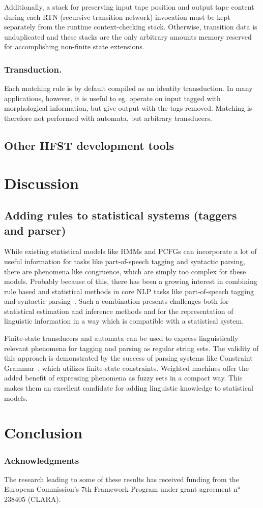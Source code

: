 \documentclass{llncs}
\begin{document}
Additionally, a stack for preserving input tape position
and output tape content during each RTN (recursive transition
network) invocation must be kept separately from the runtime
context-checking stack. Otherwise, transition data is unduplicated
and these stacks are the only arbitrary amounts memory reserved
for accomplishing non-finite state extensions.

\subsubsection{Transduction.}

Each matching rule is by default compiled as an identity transduction.
In many applications, however, it is useful to eg. operate on input
tagged with morphological information, but give output
with the tags removed. Matching is therefore not
performed with automata, but arbitrary transducers.

\subsection{Other HFST development tools}

\section{Discussion}\label{hfst:discussion}

\subsection{Adding rules to statistical systems (taggers and parser)}
While existing statistical models like HMMs and PCFGs can incorporate
a lot of useful information for tasks like part-of-speech tagging and
syntactic parsing, there are phenomena like congruence, which are
simply too complex for these models. Probably because of this, there
has been a growing interest in combining rule based and statistical
methods in core NLP tasks like part-of-speech tagging and syntactic
parsing~\cite{manning/2011}. Such a combination presents challenges
both for statistical estimation and inference methods and for the
representation of linguistic information in a way which is compatible
with a statistical system.

Finite-state transducers and automata can be used to express
linguistically relevant phenomena for tagging and parsing as regular
string sets. The validity of this approach is demonstrated by the
success of parsing systems like Constraint
Grammar~\cite{karlsson/1990}, which utilizes finite-state
constraints. Weighted machines offer the added benefit of expressing
phenomena as fuzzy sets in a compact way. This makes them an excellent
candidate for adding linguistic knowledge to statistical models.

\section{Conclusion}\label{hfst:conclusion}

\subsubsection*{Acknowledgments}
The research leading to some of these results has received funding from the
European Commission's 7th Framework Program under grant agreement n° 238405 (CLARA).




\end{document}
